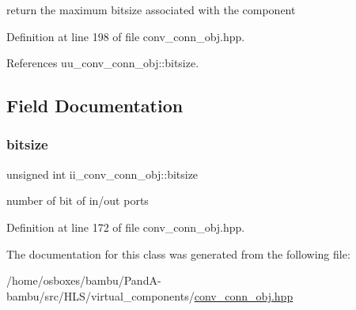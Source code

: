 return the maximum bitsize associated with the component 



Definition at line 198 of file conv\+\_\+conn\+\_\+obj.\+hpp.



References uu\+\_\+conv\+\_\+conn\+\_\+obj\+::bitsize.



\subsection{Field Documentation}
\mbox{\label{classii__conv__conn__obj_a48982d5e5043394e2ac8c61a4db5d01f}} 
\subsubsection{\texorpdfstring{bitsize}{bitsize}}
{\footnotesize\ttfamily unsigned int ii\+\_\+conv\+\_\+conn\+\_\+obj\+::bitsize\hspace{0.3cm}{\ttfamily [private]}}



number of bit of in/out ports 



Definition at line 172 of file conv\+\_\+conn\+\_\+obj.\+hpp.



The documentation for this class was generated from the following file\+:\begin{DoxyCompactItemize}
\item 
/home/osboxes/bambu/\+Pand\+A-\/bambu/src/\+H\+L\+S/virtual\+\_\+components/\hyperlink{conv__conn__obj_8hpp}{conv\+\_\+conn\+\_\+obj.\+hpp}\end{DoxyCompactItemize}
